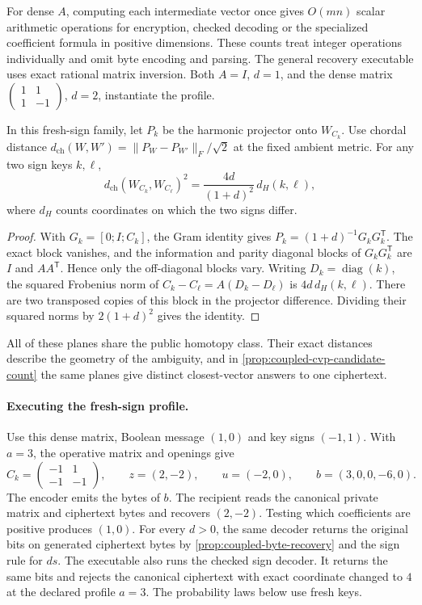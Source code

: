 For dense \(A\), computing each intermediate vector once gives
\(O(mn)\) scalar arithmetic operations for encryption, checked decoding or
the specialized coefficient formula in positive dimensions. These counts
treat integer operations individually and omit byte encoding and parsing.
The general recovery executable uses exact rational matrix inversion.
Both \(A=I\), \(d=1\), and the dense
matrix \(\left(\begin{smallmatrix}1&1\\1&-1\end{smallmatrix}\right)\),
\(d=2\), instantiate the profile.

\begin{proposition}
\label{prop:coupled-chordal-distance}
In this fresh-sign family, let \(P_k\) be the harmonic projector onto
\(W_{C_k}\). Use chordal distance \(d_{\mathrm{ch}}(W,W')=\|P_W-P_{W'}\|_F/\sqrt 2\)
at the fixed ambient metric. For any two sign keys \(k,\ell\),
\[
 d_{\mathrm{ch}}(W_{C_k},W_{C_\ell})^2
    =\frac{4d}{(1+d)^2}\,d_H(k,\ell),
\]
where \(d_H\) counts coordinates on which the two signs differ.
\end{proposition}

\begin{proof}
With \(G_k=[0;I;C_k]\), the Gram identity gives
\(P_k=(1+d)^{-1}G_kG_k^{\mathsf T}\). The exact block vanishes, and the
information and parity diagonal blocks of \(G_kG_k^{\mathsf T}\) are
\(I\) and \(AA^{\mathsf T}\). Hence only the off-diagonal blocks vary.
Writing \(D_k=\operatorname{diag}(k)\), the squared Frobenius norm of
\(C_k-C_\ell=A(D_k-D_\ell)\) is \(4d\,d_H(k,\ell)\). There are two
transposed copies of this block in the projector difference. Dividing their
squared norms by \(2(1+d)^2\) gives the identity.
\end{proof}

All of these planes share the public homotopy class. Their exact distances
describe the geometry of the ambiguity, and in \cref{prop:coupled-cvp-candidate-count}
the same planes give distinct closest-vector answers to one ciphertext.

\paragraph{Executing the fresh-sign profile.}
Use this dense matrix, Boolean message \((1,0)\) and key signs \((-1,1)\).
With \(a=3\), the operative matrix and openings give
\[
 C_k=\begin{pmatrix}-1&1\\-1&-1\end{pmatrix},\qquad
 z=(2,-2),\qquad u=(-2,0),\qquad b=(3,0,0,-6,0).
\]
The encoder emits the bytes of \(b\). The recipient reads the canonical
private matrix and ciphertext bytes and recovers \((2,-2)\). Testing which
coefficients are positive produces \((1,0)\). For every \(d>0\), the same
decoder returns the original bits on generated ciphertext bytes by
\cref{prop:coupled-byte-recovery} and the sign rule for \(ds\). The executable
also runs the checked sign decoder. It returns the same bits and rejects
the canonical ciphertext with exact coordinate changed to \(4\) at the
declared profile \(a=3\). The probability laws below use fresh keys.

